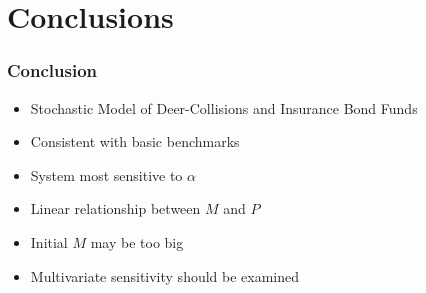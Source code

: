 \section{Conclusions}

\begin{frame}
    \frametitle{Conclusion}
\begin{itemize}
	\item Stochastic Model of Deer-Collisions and Insurance Bond Funds 
	\item Consistent with basic benchmarks
	\item System most sensitive to $\alpha$
	\item Linear relationship between $M$ and $P$
	\item Initial $M$ may be too big
	\item Multivariate sensitivity should be examined
\end{itemize}
\end{frame}




